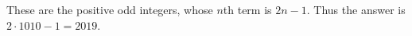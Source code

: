 These are the positive odd integers, whose $n$th term is $2n-1$. Thus the answer is $2\cdot1010-1=\boxed{2019}$.
